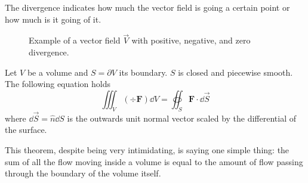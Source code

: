 \documentclass[12pt]{extarticle}
\begin{document}
The divergence indicates how much the vector field is going  a certain point or how much is it going  of it.

\begin{figure}[H]
    \centering
    
    \caption{Example of a vector field $\vec V$ with positive, negative, and zero divergence.}
\end{figure}

\begin{theorem}
    \label{thm:divergence}
    Let $V$ be a volume and $S = \partial V$ its boundary. $S$ is closed and piecewise smooth.
    The following equation holds
    \begin{equation}
        \iiint_V (\div \bm{F}) \dd{V} = \oiint_{S} \bm{F} \cdot \dd{\vec S}
    \end{equation}
    where $\dd{\vec S} = \hat n \dd{S}$ is the outwards unit normal vector scaled by the differential of the surface.
\end{theorem}

This theorem, despite being very intimidating, is saying one simple thing:
the sum of all the flow moving inside a volume is equal to the amount of flow passing through the boundary of the volume itself.
\end{document}
